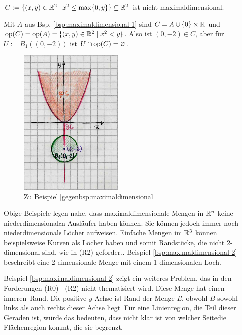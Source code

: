%
    \begin{gegenbsp}\label{gegenbsp:maximaldimensional}
        $C := \{(x,y) \in \mathbb{R}^2 \mid x^2 \leq \max\{0,y\}\} \subseteq \mathbb{R}^2$ ist nicht maximaldimensional.
    \end{gegenbsp}
%
    \begin{bew}
        Mit $A$ aus Bsp. \ref{bsp:maximaldimensional-1} sind $C = A \cup \{0\} \times \mathbb{R}$ und $\text{op}(C) = \text{op}(A) = \{(x,y) \in \mathbb{R}^2 \mid x^2 < y\}$. Also ist $(0,-2) \in C$, aber für $U := B_1((0,-2))$ ist $U \cap \text{op}(C) = \varnothing$.
    \end{bew}
%
%    
    \begin{figure}[ht]
        \centering
        \includegraphics[width=5cm]{abb/nicht-maxdim.png}
        \caption{Zu Beispiel \ref{gegenbsp:maximaldimensional}}
        \label{fig:nicht-maxdim}
    \end{figure}
%
    Obige
    Beispiele legen nahe, dass maximaldimensionale Mengen in $\mathbb{R}^n$ keine niederdimensionalen Ausläufer haben können.
    Sie können jedoch immer noch niederdimensionale Löcher aufweisen.
    Einfache Mengen im $\mathbb{R}^3$ können beispielsweise Kurven als Löcher haben und somit Randstücke, die nicht 2-dimensional sind, wie in (R2) gefordert. 
    Beispiel \ref{bsp:maximaldimensional-2} beschreibt eine 2-dimensionale Menge mit einem 1-dimensionalen Loch.
    
    Beispiel \ref{bsp:maximaldimensional-2} zeigt ein weiteres Problem, das in den Forderungen (R0) - (R2) nicht thematisiert wird. Diese Menge hat einen \glqq inneren\grqq\ Rand. Die positive $y$-Achse ist Rand der Menge $B$, obwohl $B$ sowohl links als auch rechts dieser Achse liegt. Für eine Linienregion, die Teil dieser Geraden ist, würde das bedeuten, dass nicht klar ist \glqq von welcher Seite\grqq die Flächenregion kommt, die sie begrenzt.
    
